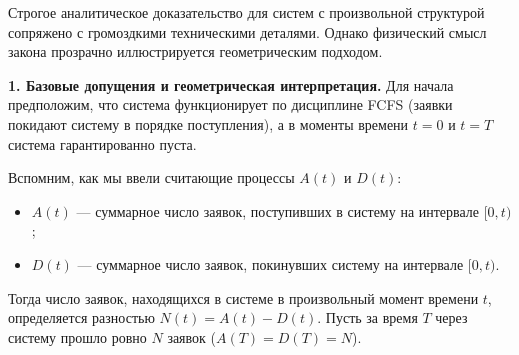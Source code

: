 \begin{tproof}
Строгое аналитическое доказательство для систем с произвольной структурой сопряжено с громоздкими техническими деталями. Однако физический смысл закона прозрачно иллюстрируется геометрическим подходом. 

\textbf{1. Базовые допущения и геометрическая интерпретация.} 
Для начала предположим, что система функционирует по дисциплине FCFS (заявки покидают систему в порядке поступления), а в моменты времени $t=0$ и $t=T$ система гарантированно пуста. 

Вспомним, как мы ввели считающие процессы $A(t)$ и $D(t)$:
\begin{itemize}
    \item $A(t)$ — суммарное число заявок, поступивших в систему на интервале $[0, t)$;
    \item $D(t)$ — суммарное число заявок, покинувших систему на интервале $[0, t)$.
\end{itemize}
Тогда число заявок, находящихся в системе в произвольный момент времени $t$, определяется разностью $N(t) = A(t) - D(t)$. Пусть за время $T$ через систему прошло ровно $N$ заявок ($A(T) = D(T) = N$).

\begin{center}
\end{center}
\end{tproof}
